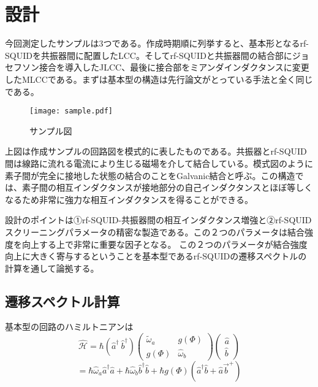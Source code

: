 \section{設計}
        今回測定したサンプルは3つである。作成時期順に列挙すると、基本形となるrf-SQUIDを共振器間に配置したLCC。そしてrf-SQUIDと共振器間の結合部にジョセフソン接合を導入したJLCC、最後に接合部をミアンダインダクタンスに変更したMLCCである。まずは基本型の構造は先行論文がとっている手法と全く同じである。
        \begin{figure}[H]
            \centering
            \texttt{[image: sample.pdf]}
            \caption{サンプル図}
        \end{figure}
        上図は作成サンプルの回路図を模式的に表したものである。共振器とrf-SQUID間は線路に流れる電流により生じる磁場を介して結合している。模式図のように素子間が完全に接地した状態の結合のことをGalvanic結合と呼ぶ。この構造では、素子間の相互インダクタンスが接地部分の自己インダクタンスとほぼ等しくなるため非常に強力な相互インダクタンスを得ることができる。

        設計のポイントは①rf-SQUID-共振器間の相互インダクタンス増強と②rf-SQUIDスクリーニングパラメータの精密な製造である。この２つのパラメータは結合強度を向上する上で非常に重要な因子となる。
        この２つのパラメータが結合強度向上に大きく寄与するということを基本型であるrf-SQUIDの遷移スペクトルの計算を通して論拠する。
    \subsection{遷移スペクトル計算}
        基本型の回路のハミルトニアンは
        \begin{equation}
            \hat{\mathcal{H}}=\hbar\left(\hat{a}^{\dagger }\ \hat{b}^{\dagger }\right)\left(\begin{array}{cc}
            \tilde{\omega}_{a} & g(\Phi ) \\
            g(\Phi ) & \hat{\omega}_{b}
            \end{array}\right)\left(\begin{array}{l}
            \hat{a} \\
            \hat{b}
            \end{array}\right)
        \end{equation}
        \begin{equation}
            = \hbar \hat{\omega}_{a} \hat{a}^{\dagger} \hat{a}+\hbar \hat{\omega}_{b} \hat{b}^{\dagger} \hat{b}+\hbar g(\Phi)\left(\hat{a}^{\dagger}\hat{b}+\hat{a} \vec{b}^{+}\right)
        \end{equation}

